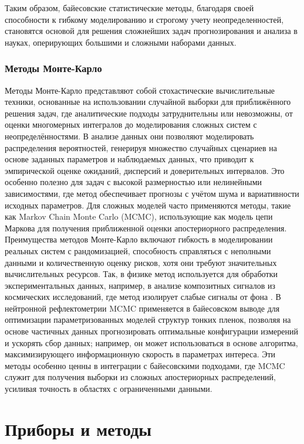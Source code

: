 \documentclass[a4paper]{article}
\begin{document}
Таким образом, байесовские статистические методы, благодаря своей способности к гибкому моделированию и строгому учету неопределенностей, становятся основой для решения сложнейших задач прогнозирования и анализа в науках, оперирующих большими и сложными наборами данных.


\subsubsection{Методы Монте-Карло}
Методы Монте-Карло представляют собой стохастические вычислительные техники, основанные на использовании случайной выборки для приближённого решения задач, где аналитические подходы затруднительны или невозможны, от оценки многомерных интегралов до моделирования сложных систем с неопределённостями. В анализе данных они позволяют моделировать распределения вероятностей, генерируя множество случайных сценариев на основе заданных параметров и наблюдаемых данных, что приводит к эмпирической оценке ожиданий, дисперсий и доверительных интервалов. Это особенно полезно для задач с высокой размерностью или нелинейными зависимостями, где метод обеспечивает прогнозы с учётом шума и вариативности исходных параметров. Для сложных моделей часто применяются методы, такие как Markov Chain Monte Carlo (MCMC), использующие как модель цепи Маркова для получения приближенной оценки апостериорного распределения.
Преимущества методов Монте-Карло включают гибкость в моделировании реальных систем с рандомизацией, способность справляться с неполными данными и количественную оценку рисков, хотя они требуют значительных вычислительных ресурсов. Так, в физике метод используется для обработки экспериментальных данных, например, в анализе композитных сигналов из космических исследований, где метод изолирует слабые сигналы от фона \cite{27}. В нейтронной рефлектометрии MCMC применяется в байесовском выводе для оптимизации параметризованных моделей структур тонких пленок, позволяя на основе частичных данных прогнозировать оптимальные конфигурации измерений и ускорять сбор данных; например, он может использоваться в основе алгоритма, максимизирующего информационную скорость в параметрах интереса. Эти методы особенно ценны в интеграции с байесовскими подходами, где MCMC служит для получения выборки из сложных апостериорных распределений, усиливая точность в областях с ограниченными данными. \cite{26}

\section{Приборы и методы}
\end{document}

